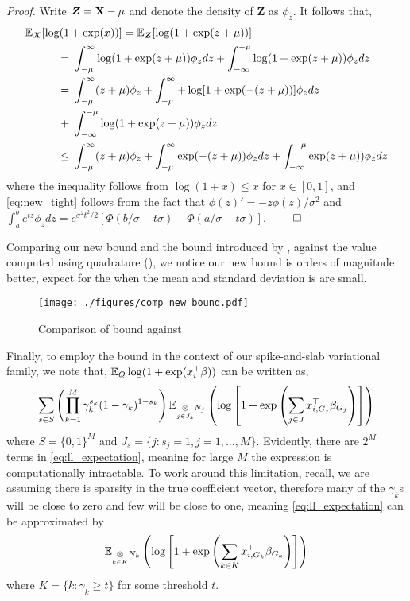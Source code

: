 \textit{Proof.} Write $\boldsymbol{Z} = \mathbf{X} - \mu$ and denote the density of $\boldsymbol{Z}$ as $\phi_z$. It follows that,
{\allowdisplaybreaks %
\begin{align}
    \E_{\boldsymbol{X}} [ \log(1 & + \exp(x)) ] =
    \E_{\boldsymbol{Z}} [ \log(1+ \exp(z + \mu)) ]
    \nonumber
    \\
    =&\ 
	\int_{-\mu}^\infty \log(1 + \exp(z + \mu)) \phi_z dz
	+ \int_{-\infty}^{-\mu} \log(1 + \exp(z + \mu)) \phi_z dz
    \nonumber
    \\
    =&\ 
	\int_{-\mu}^\infty (z + \mu) \phi_z  
	+ \int_{-\mu}^\infty + \log[1 + \exp(-(z+\mu))] \phi_z dz 
    \nonumber \\
    +&\ \int_{-\infty}^{-\mu} \log(1 + \exp(z + \mu))\phi_z dz
    \nonumber
    \\
    \leq &\ 
	\int_{-\mu}^\infty (z + \mu) \phi_z  
	+ \int_{-\mu}^\infty \exp(-(z+\mu)) \phi_z dz 
	+ \int_{-\infty}^{-\mu} \exp(z + \mu)) \phi_z dz
    \nonumber
\end{align}%
} %
where the inequality follows from $\log(1+x) \leq x$ for $x \in [0, 1]$, and \eqref{eq:new_tight} follows from the fact that $\phi(z)' = - z\phi(z) / \sigma^2 $ and $ \int_{a}^b e^{tz} \phi_z dz = e^{\sigma^2 t^2 / 2} \left[ \Phi(b/\sigma - t \sigma) - \Phi(a/\sigma - t\sigma) \right]$. $\qed$

Comparing our new bound and the bound introduced by \citep{Jakkola97}, against the value computed using quadrature (), we notice our new bound is orders of magnitude better, expect for the when the mean and standard deviation is are small.
\begin{figure}[hb]
    \centering
    \texttt{[image: ./figures/comp\_new\_bound.pdf]}
    \caption{Comparison of bound against \citep{Jakkola97}}
    \label{fig:bound_comp}
\end{figure}

Finally, to employ the bound in the context of our spike-and-slab variational family, we note that, $\mathbb{E}_Q \log ( 1 + \exp (x_i^\top \beta))$ can be written as,
\begin{equation} \label{eq:ll_expectation}
    \sum_{s \in S} \left( 
	\prod_{k=1}^M \gamma_k^{s_k} (1- \gamma_k )^{1- s_k} 
    \right)
    \mathbb{E}_{\underset{j \in J_s}{\otimes} N_j}
    \left( 
	\log \left[ 1 + \exp \left( \sum_{j \in J} x^\top_{i, G_j} \beta_{G_j} \right) \right] 
    \right)
\end{equation}
where $ S = \{0, 1\}^{M}$ and $J_s = \{j : s_j = 1, j=1,\dots,M \}$. Evidently, there are $2^M$ terms in \eqref{eq:ll_expectation}, meaning for large $M$ the expression is computationally intractable. To work around this limitation, recall, we are assuming there is sparsity in the true coefficient vector, therefore many of the $\gamma_k$s will be close to zero and few will be close to one, meaning \eqref{eq:ll_expectation} can be approximated by
\begin{equation}
    \mathbb{E}_{\underset{k \in K}{\otimes} N_k}
    \left( 
	\log \left[ 1 + \exp \left( \sum_{k \in K} x^\top_{i, G_k} \beta_{G_k} \right) \right] 
    \right)
\end{equation}
where $K = \{k : \gamma_k \geq t \}$ for some threshold $t$.





